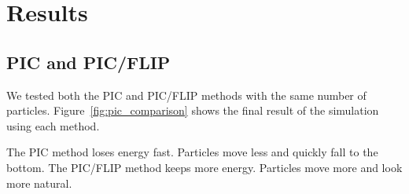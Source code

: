 \section{Results}

\subsection{PIC and PIC/FLIP}

We tested both the PIC and PIC/FLIP methods with the same number of particles. Figure~\ref{fig:pic_comparison} shows the final result of the simulation using each method.

The PIC method loses energy fast. Particles move less and quickly fall to the bottom.
The PIC/FLIP method keeps more energy. Particles move more and look more natural.


